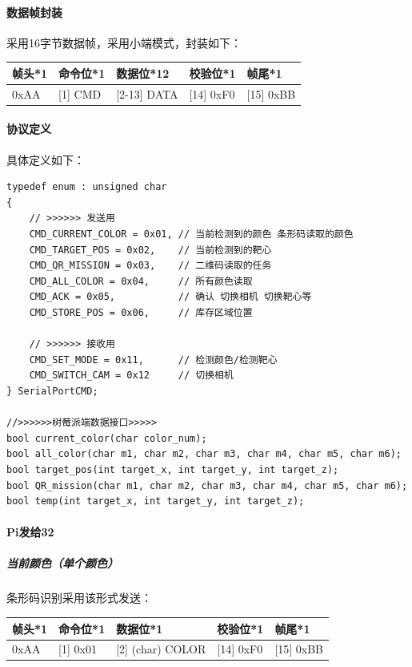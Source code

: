 \documentclass[a4paper,11pt,UTF8]{ctexart}
\begin{document}
\paragraph{数据帧封装}
采用16字节数据帧，采用小端模式，封装如下：
\begin{table}[!ht]
  \begin{tabular}{|l|l|l|l|l|}
  \hline
      帧头*1 & 命令位*1 & 数据位*12 & 校验位*1 & 帧尾*1 \\ \hline
      [0] 0xAA & [1] CMD & [2-13] DATA & [14] 0xF0 & [15] 0xBB \\ \hline
  \end{tabular}
\end{table}

\paragraph{协议定义}
具体定义如下：
\begin{lstlisting}[caption={相机端口绑定},captionpos=b]
typedef enum : unsigned char
{
    // >>>>>> 发送用
    CMD_CURRENT_COLOR = 0x01, // 当前检测到的颜色 条形码读取的颜色
    CMD_TARGET_POS = 0x02,    // 当前检测到的靶心
    CMD_QR_MISSION = 0x03,    // 二维码读取的任务
    CMD_ALL_COLOR = 0x04,     // 所有颜色读取
    CMD_ACK = 0x05,           // 确认 切换相机 切换靶心等
    CMD_STORE_POS = 0x06,     // 库存区域位置

    // >>>>>> 接收用
    CMD_SET_MODE = 0x11,      // 检测颜色/检测靶心
    CMD_SWITCH_CAM = 0x12     // 切换相机
} SerialPortCMD;

//>>>>>>树莓派端数据接口>>>>>
bool current_color(char color_num);
bool all_color(char m1, char m2, char m3, char m4, char m5, char m6);
bool target_pos(int target_x, int target_y, int target_z);
bool QR_mission(char m1, char m2, char m3, char m4, char m5, char m6);
bool temp(int target_x, int target_y, int target_z);
\end{lstlisting}


\paragraph{Pi发给32}
\subparagraph{当前颜色（单个颜色）}
条形码识别采用该形式发送：
\begin{table}[!ht]
  \begin{tabular}{|l|l|l|l|l|}
  \hline
      帧头*1 & 命令位*1 & 数据位*1 & 校验位*1 & 帧尾*1 \\ \hline
      [0] 0xAA & [1] 0x01 & [2] (char) COLOR & [14] 0xF0 & [15] 0xBB \\ \hline
  \end{tabular}
\end{table}
\end{document}
